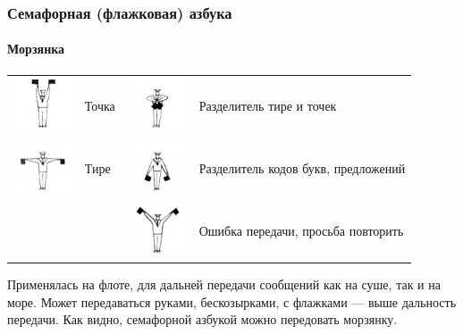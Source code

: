 \begin{frame}
    \frametitle{Семафорная (флажковая) азбука}
    \framesubtitle{Морзянка}
    
    \begin{center}
        \begin{tabular}{cl|cl}
            \includegraphics[height=45pt]{fig/semaphoreTochka}           & Точка &
                \includegraphics[height=45pt]{fig/semaphoreRazdelSymbol} & Разделитель тире и точек \\
            \includegraphics[height=45pt]{fig/semaphoreTire}             & Тире  &
                \includegraphics[height=45pt]{fig/semaphoreRazdelLetter} & Разделитель кодов букв, предложений \\
            &&
                \includegraphics[height=45pt]{fig/semaphoreOshibka}      & Ошибка передачи, просьба повторить
        \end{tabular}
    \end{center}
\end{frame}

Применялась на флоте, для дальней передачи сообщений как на суше, так и на море. Может передаваться руками, бескозырками, с флажками --- выше дальность передачи. Как видно, семафорной азбукой можно передовать морзянку.

